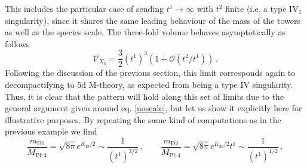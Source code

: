 This includes the particular case of sending $t^1 \to \infty$ with $t^2$ finite (i.e. a type IV$_1$ singularity), since it shares the same leading behaviour of the mass of the towers as well as the species scale. The three-fold volume behaves asymptotically as follows
%
\begin{equation}\label{eq:volP11169n=3}
	\mathcal{V}_{X_3} = \frac{3}{2} (t^1)^3 \left(1 + \mathcal{O}\left(t^2/t^1\right) \right)\, .
\end{equation}
%
%
%
Following the discussion of the previous section, this limit corresponds again to decompactifying to 5d M-theory, as expected from being a type IV singularity. %
Thus, it is clear that the pattern will hold along this set of limits due to the general argument given around eq. \eqref{noscale}, but let us show it explicitly here for illustrative purposes. By repeating the same kind of computations as in the previous example we find 
%
\begin{equation}\label{eq:massesD0D2P11169}
	\frac{m_{\text{D0}}}{M_{\text{Pl;}\, 4}} =\sqrt{8\pi } e^{K_{\text{ks}}/2} \sim \frac{1}{(t^1)^{3/2}}\, , \qquad \frac{m_{\text{D2}}}{M_{\text{Pl;}\, 4}} =\sqrt{8\pi } e^{K_{\text{ks}}/2} t^1 \sim \frac{1}{(t^1)^{1/2}}\, ,
\end{equation}
